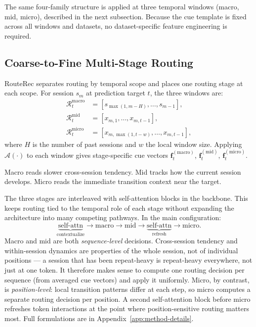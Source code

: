 \documentclass[sigconf,review,anonymous]{acmart}
\begin{document}
The same four-family structure is applied at three temporal windows (macro, mid, micro), described in the next subsection. Because the cue template is fixed across all windows and datasets, no dataset-specific feature engineering is required.


\subsection{Coarse-to-Fine Multi-Stage Routing}
\label{sec:multi-stage-routing}

RouteRec separates routing by temporal scope and places one routing stage at each scope. For session $s_m$ at prediction target $t$, the three windows are:
\begin{align}
\mathcal{R}^{\mathrm{macro}}_t &= [s_{\max(1,m-H)},\dots,s_{m-1}], \\
\mathcal{R}^{\mathrm{mid}}_t   &= [x_{m,1},\dots,x_{m,t-1}], \\
\mathcal{R}^{\mathrm{micro}}_t &= [x_{m,\max(1,t-w)},\dots,x_{m,t-1}],
\end{align}
where $H$ is the number of past sessions and $w$ the local window size. Applying $\mathcal{A}(\cdot)$ to each window gives stage-specific cue vectors $\mathbf{f}^{(\mathrm{macro})}_t$, $\mathbf{f}^{(\mathrm{mid})}_t$, $\mathbf{f}^{(\mathrm{micro})}_t$.

Macro reads slower cross-session tendency. Mid tracks how the current session develops. Micro reads the immediate transition context near the target.

The three stages are interleaved with self-attention blocks in the backbone. This keeps routing tied to the temporal role of each stage without expanding the architecture into many competing pathways. In the main configuration:
\[
\underbrace{\text{self-attn}}_{\text{contextualize}} \to \text{macro} \to \text{mid} \to \underbrace{\text{self-attn}}_{\text{refresh}} \to \text{micro}.
\]
Macro and mid are both \emph{sequence-level} decisions. Cross-session tendency and within-session dynamics are properties of the whole session, not of individual positions --- a session that has been repeat-heavy is repeat-heavy everywhere, not just at one token. It therefore makes sense to compute one routing decision per sequence (from averaged cue vectors) and apply it uniformly. Micro, by contrast, is \emph{position-level}: local transition patterns differ at each step, so micro computes a separate routing decision per position. A second self-attention block before micro refreshes token interactions at the point where position-sensitive routing matters most. Full formulations are in Appendix~\ref{app:method-details}.
\end{document}
